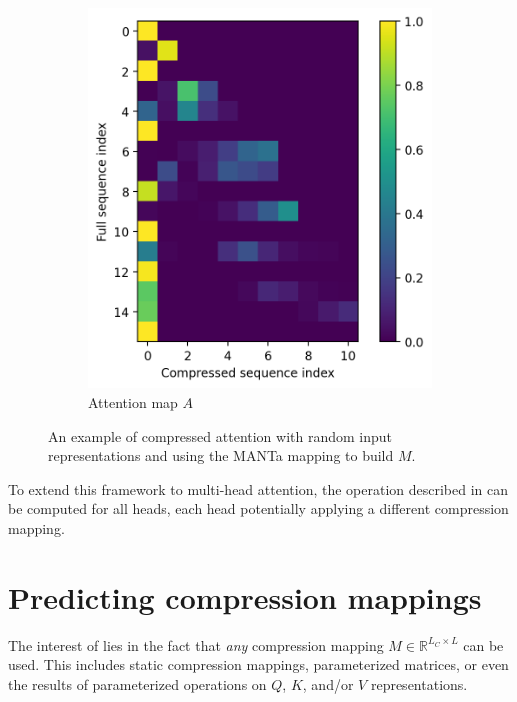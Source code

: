 \begin{figure}[!ht]
\begin{subfigure}[b]{0.48\columnwidth}
         \includegraphics[width=\linewidth]{sources/part_2/kv_cache/imgs/compressed_attn_map_ex.png}
         \caption{Attention map $A$}
    \end{subfigure}
    
    \caption{An example of compressed attention with random input representations and using the MANTa mapping to build $M$.}
    \label{fig:formula_viz_dmc}
\end{figure}

To extend this framework to multi-head attention, the operation described in  can be computed for all heads, each head potentially applying a different compression mapping.

\section{Predicting compression mappings}
The interest of  lies in the fact that \textit{any} compression mapping $M \in \mathbb{R}^{L_C \times L}$ can be used. This includes static compression mappings, parameterized matrices, or even the results of parameterized operations on $Q$, $K$, and/or $V$ representations.

